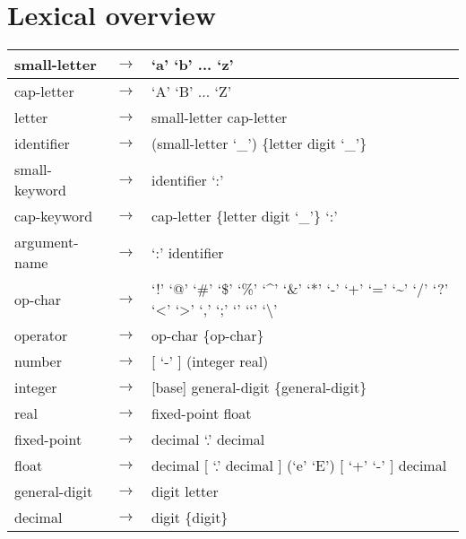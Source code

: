 \documentclass[letterpaper,10pt,english]{sphinxmanual}
\begin{document}
\section{Lexical overview}
\label{\detokenize{lexicaloverview:lexical-overview}}\label{\detokenize{lexicaloverview::doc}}
\noindent\begin{tabulary}{\linewidth}{|L|L|L|}
\hline

small-letter
&
\(\rightarrow\)
&
‘a’ \textbar{} ‘b’ \textbar{} ... \textbar{} ‘z’
\\
\hline
cap-letter
&
\(\rightarrow\)
&
‘A’ \textbar{} ‘B’ \textbar{} ... \textbar{} ‘Z’
\\
\hline
letter
&
\(\rightarrow\)
&
small-letter \textbar{} cap-letter
\\
\hline
identifier
&
\(\rightarrow\)
&
(small-letter \textbar{} ‘\_’) \{letter \textbar{} digit \textbar{} ‘\_’\}
\\
\hline
small-keyword
&
\(\rightarrow\)
&
identifier ‘:’
\\
\hline
cap-keyword
&
\(\rightarrow\)
&
cap-letter \{letter \textbar{} digit \textbar{} ‘\_’\} ‘:’
\\
\hline
argument-name
&
\(\rightarrow\)
&
‘:’ identifier
\\
\hline
op-char
&
\(\rightarrow\)
&
‘!’ \textbar{} ‘@’ \textbar{} ‘\#’ \textbar{} ‘\$’ \textbar{} ‘\%’ \textbar{} ‘\textasciicircum{}’ \textbar{} ‘\&’ \textbar{} ‘*’ \textbar{} ‘-’ \textbar{} ‘+’ \textbar{} ‘=’ \textbar{} ‘\textasciitilde{}’ \textbar{} ‘/’ \textbar{} ‘?’ \textbar{} ‘\textless{}’ \textbar{} ‘\textgreater{}’ \textbar{} ‘,’ \textbar{} ‘;’ \textbar{} ‘\textbar{}’ \textbar{} ‘‘’ \textbar{} ‘\textbackslash{}’
\\
\hline
operator
&
\(\rightarrow\)
&
op-char \{op-char\}
\\
\hline
number
&
\(\rightarrow\)
&
{[} ‘-’ {]} (integer \textbar{} real)
\\
\hline
integer
&
\(\rightarrow\)
&
{[}base{]} general-digit \{general-digit\}
\\
\hline
real
&
\(\rightarrow\)
&
fixed-point \textbar{} float
\\
\hline
fixed-point
&
\(\rightarrow\)
&
decimal ‘.’ decimal
\\
\hline
float
&
\(\rightarrow\)
&
decimal {[} ‘.’ decimal {]} (‘e’ \textbar{} ‘E’) {[} ‘+’ \textbar{} ‘-’ {]} decimal
\\
\hline
general-digit
&
\(\rightarrow\)
&
digit \textbar{} letter
\\
\hline
decimal
&
\(\rightarrow\)
&
digit \{digit\}

\end{tabulary}
\end{document}
